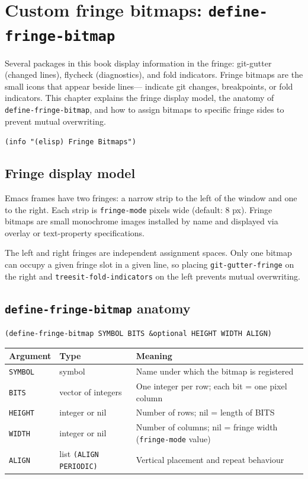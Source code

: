 \chapter{Custom fringe bitmaps: \texttt{define-fringe-bitmap}}
\label{ch:fringe-bitmaps}
\minitoc\label{custom-fringe-bitmaps-define-fringe-bitmap}

Several packages in this book display information in the fringe:
git-gutter (changed lines), flycheck (diagnostics), and fold
indicators.  Fringe bitmaps are the small icons that appear beside
lines---
indicate git changes, breakpoints, or fold indicators.  This chapter
explains the fringe display model, the anatomy of
\texttt{define-fringe-bitmap}, and how to assign bitmaps to specific
fringe sides to prevent mutual overwriting.

\texttt{(info "(elisp) Fringe Bitmaps")}

\section{Fringe display model}\label{fringe-display-model}

Emacs frames have two fringes: a narrow strip to the left of the window and one to the right. Each strip is \texttt{fringe-mode} pixels wide (default: 8 px). Fringe bitmaps are small monochrome images installed by name and displayed via overlay or text-property specifications.

The left and right fringes are independent assignment spaces. Only one bitmap can occupy a given fringe slot in a given line, so placing \texttt{git-gutter-fringe} on the right and \texttt{treesit-fold-indicators} on the left prevents mutual overwriting.

\section{\texttt{define-fringe-bitmap} anatomy}\label{define-fringe-bitmap-anatomy}

\begin{verbatim}
(define-fringe-bitmap SYMBOL BITS &optional HEIGHT WIDTH ALIGN)
\end{verbatim}

\begin{longtable}[]{@{}lll@{}}
\toprule
Argument & Type & Meaning \\
\midrule
\texttt{SYMBOL} & symbol & Name under which the bitmap is registered \\
\texttt{BITS} & vector of integers & One integer per row; each bit = one pixel column \\
\texttt{HEIGHT} & integer or nil & Number of rows; nil = length of BITS \\
\texttt{WIDTH} & integer or nil & Number of columns; nil = fringe width (\texttt{fringe-mode} value) \\
\texttt{ALIGN} & list \texttt{(ALIGN PERIODIC)} & Vertical placement and repeat behaviour \\
\bottomrule
\end{longtable}

